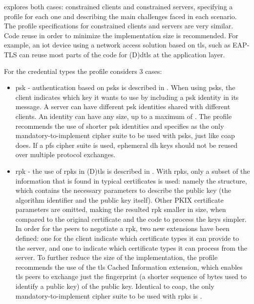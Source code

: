 \documentclass{llncs}
\begin{document}
 explores both cases: constrained clients and constrained servers, specifying
a profile for each one and describing the main challenges faced in each scenario.
The profile specifications for constrained clients and servers are very similar.
Code reuse in order to minimize the implementation size is recommended. For example, an \gls{iot} device
using a network access solution based on \gls{tls}, such as EAP-TLS\cite{rfc5216}
can reuse most parts of the code for (D)\gls{dtls} at the application layer.

For the credential types the profile considers 3 cases:

\begin{itemize}
  \item \gls{psk} - authentication based on \gls{psk}s is described in
  \cite{RFC4279}. When using \gls{psk}s, the client indicates which
  key it wants to use by including a \gls{psk} identity in its  message.
  A server can have different \gls{psk} identities shared with different clients.
  An identity can have any size, up to a maximum of .
  The profile recommends the use of shorter \gls{psk} identities and specifies
   as the only mandatory-to-implement
  cipher suite to be used with \gls{psk}s, just like \gls{coap} does. If a \gls{pfs} cipher suite is used, ephemeral
  \gls{dh} keys should not be reused over multiple protocol exchanges.

  \item \gls{rpk} - the use of \gls{rpk}s in (D)\gls{tls} is described in \cite{RFC7250}.
  With \gls{rpk}s, only a subset of the information that is found in typical certificates
  is used: namely the  structure, which contains
  the necessary parameters to describe the public key (the algorithm identifier
  and the public key itself). Other PKIX certificate\cite{RFCabc} parameters are
  omitted, making the resulted \gls{rpk} smaller in size, when compared to the
  original certificate and the code to process the keys simpler. In order for the
  peers to negotiate a \gls{rpk}, two new extensions have been defined:
  one for the client indicate which certificate types it can provide to the server, and one to indicate which certificate types it can process from the server. To further reduce the size of the implementation, the profile
  recommends the use of the \gls{tls} Cached Information extension\cite{RFC7924}, which
  enables \gls{tls} peers to exchange just the fingerprint (a shorter sequence of bytes
  used to identify a public key) of the public key. Identical to \gls{coap}, the only mandatory-to-implement
  cipher suite to be used with \gls{rpk}s is .


\end{itemize}
\end{document}
